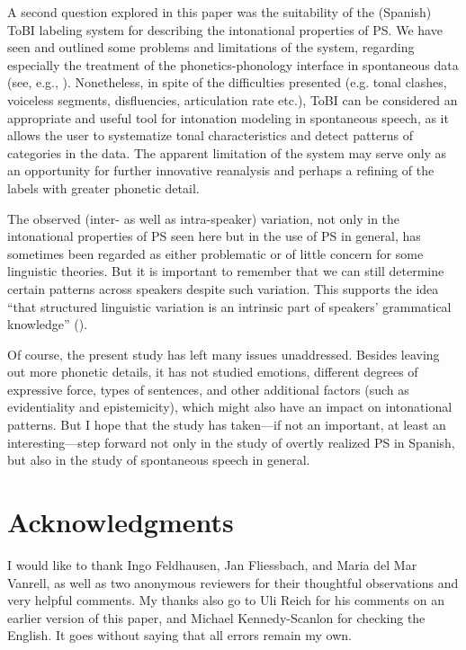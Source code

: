 \documentclass[output=paper]{langsci/langscibook}
\begin{document}
A second question explored in this paper was the suitability of the (Spanish) ToBI labeling system for describing the intonational properties of PS. We have seen and outlined some problems and limitations of the system, regarding especially the treatment of the phonetics-phonology interface in spontaneous data (see, e.g., \citealt{Breen2012}). Nonetheless, in spite of the difficulties presented (e.g. tonal clashes, voiceless segments, disfluencies, articulation rate etc.), ToBI can be considered an appropriate and useful tool for intonation modeling in spontaneous speech, as it allows the user to systematize tonal characteristics and detect patterns of categories in the data. The apparent limitation of the system may serve only as an opportunity for further innovative reanalysis and perhaps a refining of the labels with greater phonetic detail.\pagebreak

The observed (inter- as well as intra-speaker) variation, not only in the intonational properties of PS seen here but in the use of PS in general, has sometimes been regarded as either problematic or of little concern for some linguistic theories. But it is important to remember that we can still determine certain patterns across speakers despite such variation. This supports the idea ``that structured linguistic variation is an intrinsic part of speakers’ grammatical knowledge'' (\citealt[xiii]{Carvalho2015}).

Of course, the present study has left many issues unaddressed. Besides leaving out more phonetic details, it has not studied emotions, different degrees of expressive force, types of sentences, and other additional factors (such as evidentiality and epistemicity), which might also have an impact on intonational patterns. But I hope that the study has taken—if not an important, at least an interesting—step forward not only in the study of overtly realized PS in Spanish, but also in the study of spontaneous speech in general.

\section*{Acknowledgments}
I would like to thank Ingo Feldhausen, Jan Fliessbach, and Maria del Mar Vanrell, as well as two anonymous reviewers for their thoughtful observations and very helpful comments. My thanks also go to Uli Reich for his comments on an earlier version of this paper, and Michael Kennedy-Scanlon for checking the English. It goes without saying that all errors remain my own.

{\sloppy
\printbibliography[heading=subbibliography,notkeyword=this]
}
\end{document}
